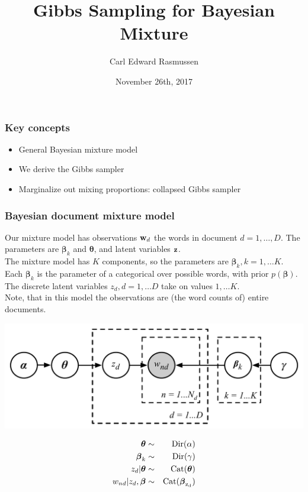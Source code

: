 

\title{Gibbs Sampling for Bayesian Mixture}
\author{Carl Edward Rasmussen}
\date{November 26th, 2017}




\begin{frame}
\titlepage
\end{frame}


\begin{frame}
\frametitle{Key concepts}

\begin{itemize}
\item General Bayesian mixture model
\item We derive the Gibbs sampler
\item Marginalize out mixing proportions: collapsed Gibbs sampler
\end{itemize}

\end{frame}


\begin{frame}
\frametitle{Bayesian document mixture model}

Our mixture model has observations ${\bf w}_d$ the words in document
$d=1,\ldots,D$. The parameters are $\boldsymbol\beta_k$ and $\boldsymbol\theta$, and latent variables ${\bf z}$.\\[1ex]

The mixture model has $K$ components, so the parameters are
$\boldsymbol\beta_k, k=1,\ldots K$. Each $\boldsymbol\beta_k$ is the
parameter of a categorical over possible words, with prior
$p(\boldsymbol\beta)$. The discrete latent variables
$z_d, d=1,\ldots D$ take on values $1,\dots
K$.\\[1ex]

Note, that in this model the observations are (the word counts of)
entire documents.

\begin{minipage}{0.7\linewidth}
\centerline{\includegraphics[width=0.9\linewidth]{bayes_mix_categorical_model}}
\end{minipage}
\begin{minipage}{0.29\linewidth}
{\small
\begin{eqnarray*}
\boldsymbol{\theta} & \sim & \mathrm{Dir}(\alpha) \\
\boldsymbol{\beta}_k & \sim & \mathrm{Dir}(\gamma) \\
z_d | \boldsymbol{\theta} & \sim & \rm{Cat}(\boldsymbol{\theta})\\
w_{nd} | z_d, \boldsymbol{\beta} & \sim & \rm{Cat}(\boldsymbol{\beta}_{z_d})
\end{eqnarray*}
}
\end{minipage}
\end{frame}



